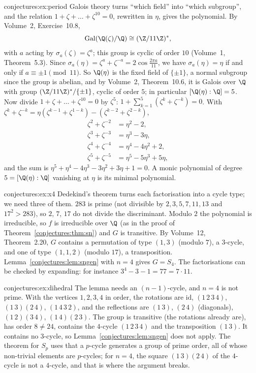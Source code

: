 \begin{solution}{conjectures:ex:period}
\idea Galois theory turns ``which field'' into ``which subgroup'', and the relation $1+\zeta+\dots+\zeta^{10}=0$, rewritten in $\eta$, gives the polynomial.
\writeup By Volume~2, Exercise~10.8,
\[
\operatorname{Gal}(\Q(\zeta)/\Q)\cong(\Z/11\Z)^*,
\]
with $a$ acting by $\sigma_a(\zeta)=\zeta^a$; this group is cyclic of order $10$ (Volume~1, Theorem~5.3). Since $\sigma_a(\eta)=\zeta^a+\zeta^{-a}=2\cos\frac{2\pi a}{11}$, we have $\sigma_a(\eta)=\eta$ if and only if
$a\equiv\pm1\pmod{11}$. So $\Q(\eta)$ is the fixed field of $\{\pm1\}$, a normal subgroup since the group is abelian, and by Volume~2, Theorem~10.6, it is
Galois over $\Q$ with group $(\Z/11\Z)^*/\{\pm1\}$, cyclic of order $5$; in particular $[\Q(\eta):\Q]=5$. Now divide $1+\zeta+\dots+\zeta^{10}=0$ by
$\zeta^5$: $1+\sum_{k=1}^5(\zeta^k+\zeta^{-k})=0$. With $\zeta^k+\zeta^{-k}=\eta(\zeta^{k-1}+\zeta^{1-k})-(\zeta^{k-2}+\zeta^{2-k})$,
\[
\begin{aligned}
\zeta^2+\zeta^{-2}&=\eta^2-2,\\
\zeta^3+\zeta^{-3}&=\eta^3-3\eta,\\
\zeta^4+\zeta^{-4}&=\eta^4-4\eta^2+2,\\
\zeta^5+\zeta^{-5}&=\eta^5-5\eta^3+5\eta,
\end{aligned}
\]
and the sum is $\eta^5+\eta^4-4\eta^3-3\eta^2+3\eta+1=0$. A monic polynomial of degree $5=[\Q(\eta):\Q]$ vanishing at $\eta$ is its minimal polynomial.
\end{solution}

\begin{solution}{conjectures:ex:x4}
\idea Dedekind's theorem turns each factorisation into a cycle type; we need three of them.
\writeup $283$ is prime (not divisible by $2,3,5,7,11,13$ and $17^2>283$), so $2$, $7$, $17$ do not divide the discriminant. Modulo $2$ the polynomial is
irreducible, so $f$ is irreducible over $\Q$ (as in the proof of Theorem~\ref{conjectures:thm:sn}) and $G$ is transitive. By Volume~12, Theorem~2.20, $G$ contains a
permutation of type $(1,3)$ (modulo $7$), a $3$-cycle, and one of type $(1,1,2)$ (modulo $17$), a transposition. Lemma~\ref{conjectures:lem:sngen} with $n=4$ gives
$G=S_4$. The factorisations can be checked by expanding: for instance $3^4-3-1=77=7\cdot11$.
\end{solution}

\begin{solution}{conjectures:ex:dihedral}
\idea The lemma needs an $(n-1)$-cycle, and $n=4$ is not prime.
\writeup With the vertices $1,2,3,4$ in order, the rotations are $\mathrm{id}$, $(1\,2\,3\,4)$, $(1\,3)(2\,4)$, $(1\,4\,3\,2)$, and the reflections are
$(1\,3)$, $(2\,4)$ (diagonals), $(1\,2)(3\,4)$, $(1\,4)(2\,3)$. The group is transitive (the rotations already are), has order $8\ne24$, contains the
$4$-cycle $(1\,2\,3\,4)$ and the transposition $(1\,3)$. It contains no $3$-cycle, so Lemma~\ref{conjectures:lem:sngen} does not apply. The theorem for $S_p$ uses that
a $p$-cycle generates a group of prime order, all of whose non-trivial elements are $p$-cycles; for $n=4$, the square $(1\,3)(2\,4)$ of the $4$-cycle is
not a $4$-cycle, and that is where the argument breaks.
\end{solution}

